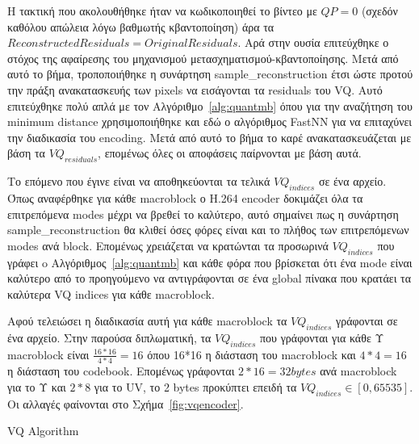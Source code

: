 \indent Η τακτική που ακολουθήθηκε ήταν να κωδικοποιηθεί το βίντεο με $QP=0$ (σχεδόν καθόλου απώλεια λόγω βαθμωτής κβαντοποίηση) άρα τα $Reconstructed Residuals = Original Residuals$. Αρά στην ουσία επιτεύχθηκε ο στόχος της αφαίρεσης του μηχανισμού μετασχηματισμού-κβαντοποίησης. Μετά από αυτό το βήμα, τροποποιήθηκε η συνάρτηση sample\_reconstruction έτσι ώστε προτού την πράξη ανακατασκευής των pixels να εισάγονται τα residuals του VQ. Αυτό επιτεύχθηκε πολύ απλά με τον Αλγόριθμο~\ref{alg:quantmb} όπου για την αναζήτηση του minimum distance χρησιμοποιήθηκε και εδώ ο αλγόριθμος FastNN για να επιταχύνει την διαδικασία του encoding. Μετά από αυτό το βήμα το καρέ ανακατασκευάζεται με βάση τα $VQ_{residuals}$, επομένως όλες οι αποφάσεις παίρνονται με βάση αυτά.

\indent Το επόμενο που έγινε είναι να αποθηκεύονται τα τελικά $VQ_{indices}$ σε ένα αρχείο. Όπως αναφέρθηκε για κάθε macroblock ο H.264 encoder δοκιμάζει όλα τα επιτρεπόμενα modes μέχρι να βρεθεί το καλύτερο, αυτό σημαίνει πως η συνάρτηση sample\_reconstruction θα κλιθεί όσες φόρες είναι και το πλήθος των επιτρεπόμενων modes ανά block. Επομένως χρειάζεται να κρατώνται τα προσωρινά $VQ_{indices}$ που γράφει o Αλγόριθμος~\ref{alg:quantmb} και κάθε φόρα που βρίσκεται ότι ένα mode είναι καλύτερο από το προηγούμενο να αντιγράφονται σε ένα global πίνακα που κρατάει τα καλύτερα VQ indices για κάθε macroblock.

\indent Αφού τελειώσει η διαδικασία αυτή για κάθε macroblock  τα $VQ_{indices}$ γράφονται σε ένα αρχείο. Στην παρούσα διπλωματική, τα $VQ_{indices}$ που γράφονται για κάθε Υ macroblock είναι $\frac{16*16}{4*4}=16$ όπου 16*16 η διάσταση του macroblock και $4*4=16$ η διάσταση του codebook. Επομένως γράφονται $2*16 = 32bytes$ ανά macroblock για το Υ και $2*8$ για το UV, το 2 bytes προκύπτει επειδή τα $VQ_{indices}\in[0,65535]$. Οι αλλαγές φαίνονται στο Σχήμα~\ref{fig:vqencoder}.

\begin{algorithm}[H]
\begin{algorithmic}[1]
\EndFor
\EndFunction
\end{algorithmic}
\caption{VQ Algorithm}
\label{alg:quantmb}
\end{algorithm}

